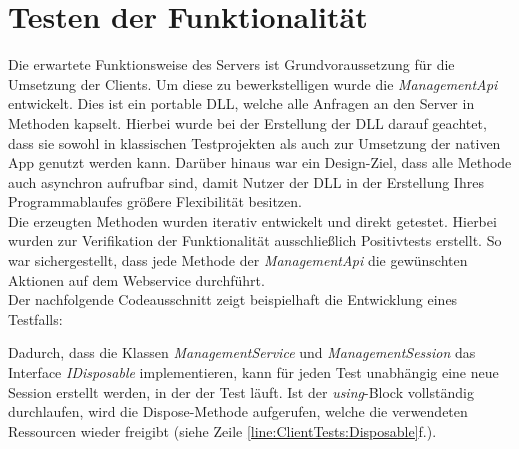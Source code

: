 \section{Testen der Funktionalität}
\label{sec:server-tests}
Die erwartete Funktionsweise des Servers ist Grundvoraussetzung für die Umsetzung der Clients. Um diese zu bewerkstelligen wurde die \textit{ManagementApi} entwickelt. Dies ist ein portable \ac{DLL}, welche alle Anfragen an den Server in Methoden kapselt. Hierbei wurde bei der Erstellung der \ac{DLL} darauf geachtet, dass sie sowohl in klassischen Testprojekten als auch zur Umsetzung der nativen App genutzt werden kann. Darüber hinaus war ein Design-Ziel, dass alle Methode auch asynchron aufrufbar sind, damit Nutzer der \ac{DLL} in der Erstellung Ihres Programmablaufes größere Flexibilität besitzen. \\
Die erzeugten Methoden wurden iterativ entwickelt und direkt getestet. Hierbei wurden zur Verifikation der Funktionalität ausschließlich Positivtests erstellt. So war sichergestellt, dass jede Methode der \textit{ManagementApi} die gewünschten Aktionen auf dem Webservice durchführt. \\
Der nachfolgende Codeausschnitt zeigt beispielhaft die Entwicklung eines Testfalls:

Dadurch, dass die Klassen \textit{ManagementService} und \textit{ManagementSession} das Interface \textit{IDisposable} implementieren, kann für jeden Test unabhängig eine neue Session erstellt werden, in der der Test läuft. Ist der \textit{using}-Block vollständig durchlaufen, wird die Dispose-Methode aufgerufen, welche die verwendeten Ressourcen wieder freigibt (siehe Zeile \ref{line:ClientTests:Disposable}f.). 
